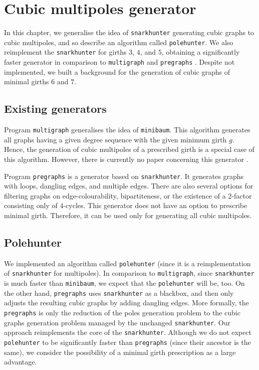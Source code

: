 \chapter{Cubic multipoles generator} %
\label{ch:polehunter}

In this chapter, we generalise the idea of \texttt{snarkhunter} generating cubic graphs to cubic multipoles, and so describe an algorithm called \texttt{polehunter}. We also reimplement the \texttt{snarkhunter} for girths $3$, $4$, and $5$, obtaining a significantly faster generator in comparison to \texttt{multigraph} and \texttt{pregraphs} \cite{pregraph}. Despite not implemented, we built a background for the generation of cubic graphs of minimal girths $6$ and $7$.

\section{Existing generators}

Program \texttt{multigraph} generalises the idea of \texttt{minibaum}. This algorithm generates all graphs having a given degree sequence with the given minimum girth $g$. Hence, the generation of cubic multipoles of a prescribed girth is a special case of this algorithm. However, there is currently no paper concerning this generator \cite{multigraph}.

Program \texttt{pregraphs} \cite{pregraph} is a generator based on \texttt{snarkhunter}. It generates graphs with loops, dangling edges, and multiple edges. There are also several options for filtering graphs on edge-colourability, bipartiteness, or the existence of a 2-factor consisting only of $4$-cycles. This generator does not have an option to prescribe minimal girth. Therefore, it can be used only for generating all cubic multipoles.

\section{Polehunter}

We implemented an algorithm called \texttt{polehunter} (since it is a reimplementation of \texttt{snarkhunter} for multipoles). In comparison to \texttt{multigraph}, since \texttt{snarkhunter} is much faster than \texttt{minibaum}, we expect that the \texttt{polehunter} will be, too. On the other hand, \texttt{pregraphs} uses \texttt{snarkhunter} as a blackbox, and then only adjusts the resulting cubic graphs by adding dangling edges. More formally, the \texttt{pregraphs} is only the reduction of the poles generation problem to the cubic graphs generation problem managed by the unchanged \texttt{snarkhunter}. Our approach reimplements the core of the \texttt{snarkhunter}. Although we do not expect \texttt{polehunter} to be significantly faster than \texttt{pregraphs} (since their ancestor is the same), we consider the possibility of a minimal girth prescription as a large advantage.

